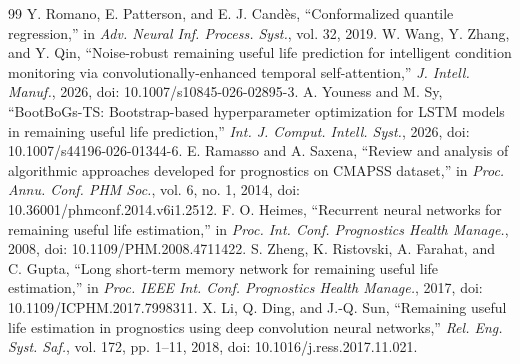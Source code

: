 \documentclass[journal]{IEEEtran}
\begin{document}
\begin{thebibliography}{99}
 Y. Romano, E. Patterson, and E. J. Cand\`es, ``Conformalized quantile regression,'' in \emph{Adv. Neural Inf. Process. Syst.}, vol. 32, 2019.
 W. Wang, Y. Zhang, and Y. Qin, ``Noise-robust remaining useful life prediction for intelligent condition monitoring via convolutionally-enhanced temporal self-attention,'' \emph{J. Intell. Manuf.}, 2026, doi: 10.1007/s10845-026-02895-3.
 A. Youness and M. Sy, ``BootBoGs-TS: Bootstrap-based hyperparameter optimization for LSTM models in remaining useful life prediction,'' \emph{Int. J. Comput. Intell. Syst.}, 2026, doi: 10.1007/s44196-026-01344-6.
 E. Ramasso and A. Saxena, ``Review and analysis of algorithmic approaches developed for prognostics on CMAPSS dataset,'' in \emph{Proc. Annu. Conf. PHM Soc.}, vol. 6, no. 1, 2014, doi: 10.36001/phmconf.2014.v6i1.2512.
 F. O. Heimes, ``Recurrent neural networks for remaining useful life estimation,'' in \emph{Proc. Int. Conf. Prognostics Health Manage.}, 2008, doi: 10.1109/PHM.2008.4711422.
 S. Zheng, K. Ristovski, A. Farahat, and C. Gupta, ``Long short-term memory network for remaining useful life estimation,'' in \emph{Proc. IEEE Int. Conf. Prognostics Health Manage.}, 2017, doi: 10.1109/ICPHM.2017.7998311.
 X. Li, Q. Ding, and J.-Q. Sun, ``Remaining useful life estimation in prognostics using deep convolution neural networks,'' \emph{Rel. Eng. Syst. Saf.}, vol. 172, pp. 1--11, 2018, doi: 10.1016/j.ress.2017.11.021.
\end{thebibliography}
\end{document}
